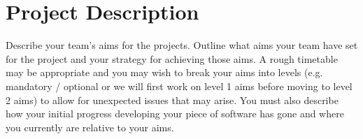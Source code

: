 
\section{Project Description} %
Describe your team’s aims for the projects. Outline what aims your team have set for the project and your strategy for
achieving those aims. A rough timetable may be appropriate and you may wish to break your aims into levels
 (e.g. mandatory / optional or we will first work on level 1 aims before moving to level 2 aims) to allow for
 unexpected issues that may arise. You must also describe how your initial progress developing your piece of software
 has gone and where you currently are relative to your aims.

